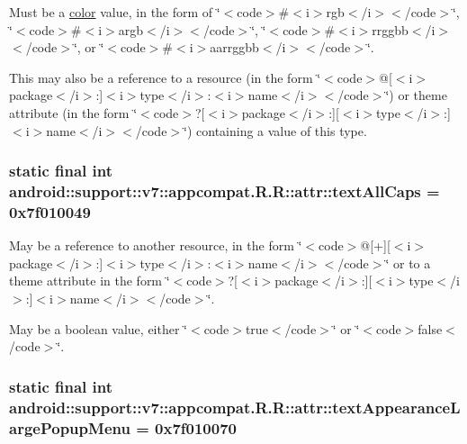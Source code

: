 Must be a \hyperlink{classandroid_1_1support_1_1v7_1_1appcompat_1_1_r_1_1color}{color} value, in the form of \char`\"{}$<$code$>$\#$<$i$>$rgb$<$/i$>$$<$/code$>$\char`\"{}, \char`\"{}$<$code$>$\#$<$i$>$argb$<$/i$>$$<$/code$>$\char`\"{}, \char`\"{}$<$code$>$\#$<$i$>$rrggbb$<$/i$>$$<$/code$>$\char`\"{}, or \char`\"{}$<$code$>$\#$<$i$>$aarrggbb$<$/i$>$$<$/code$>$\char`\"{}. 

This may also be a reference to a resource (in the form \char`\"{}$<$code$>$@\mbox{[}$<$i$>$package$<$/i$>$:\mbox{]}$<$i$>$type$<$/i$>$:$<$i$>$name$<$/i$>$$<$/code$>$\char`\"{}) or theme attribute (in the form \char`\"{}$<$code$>$?\mbox{[}$<$i$>$package$<$/i$>$:\mbox{]}\mbox{[}$<$i$>$type$<$/i$>$:\mbox{]}$<$i$>$name$<$/i$>$$<$/code$>$\char`\"{}) containing a value of this type. \hypertarget{classandroid_1_1support_1_1v7_1_1appcompat_1_1_r_1_1attr_ffa6d158022ffbf0f333c71bd57ce180}{
\subsubsection[{textAllCaps}]{\setlength{\rightskip}{0pt plus 5cm}static final int android::support::v7::appcompat.R.R::attr::textAllCaps = 0x7f010049}}
\label{classandroid_1_1support_1_1v7_1_1appcompat_1_1_r_1_1attr_ffa6d158022ffbf0f333c71bd57ce180}


May be a reference to another resource, in the form \char`\"{}$<$code$>$@\mbox{[}+\mbox{]}\mbox{[}$<$i$>$package$<$/i$>$:\mbox{]}$<$i$>$type$<$/i$>$:$<$i$>$name$<$/i$>$$<$/code$>$\char`\"{} or to a theme attribute in the form \char`\"{}$<$code$>$?\mbox{[}$<$i$>$package$<$/i$>$:\mbox{]}\mbox{[}$<$i$>$type$<$/i$>$:\mbox{]}$<$i$>$name$<$/i$>$$<$/code$>$\char`\"{}. 

May be a boolean value, either \char`\"{}$<$code$>$true$<$/code$>$\char`\"{} or \char`\"{}$<$code$>$false$<$/code$>$\char`\"{}. \hypertarget{classandroid_1_1support_1_1v7_1_1appcompat_1_1_r_1_1attr_1082980434da9dbead38ea762169cd4c}{
\subsubsection[{textAppearanceLargePopupMenu}]{\setlength{\rightskip}{0pt plus 5cm}static final int android::support::v7::appcompat.R.R::attr::textAppearanceLargePopupMenu = 0x7f010070}}
\label{classandroid_1_1support_1_1v7_1_1appcompat_1_1_r_1_1attr_1082980434da9dbead38ea762169cd4c}


